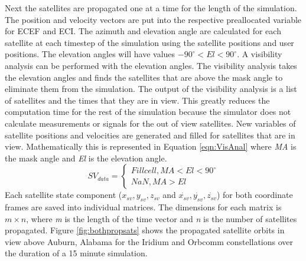 \documentclass[12pt]{report}
\begin{document}
Next the satellites are propagated one at a time for the length of the simulation. The position and velocity vectors are put into the respective preallocated variable for ECEF and ECI. The azimuth and elevation angle are calculated for each satellite at each timestep of the simulation using the satellite positions and user positions. The elevation angles will have values $-90^{\circ} < El < 90^{\circ}$. A visibility analysis can be performed with the elevation angles. The visibility analysis takes the elevation angles and finds the satellites that are above the mask angle to eliminate them from the simulation. The output of the visibility analysis is a list of satellites and the times that they are in view. This greatly reduces the computation time for the rest of the simulation because the simulator does not calculate measurements or signals for the out of view satellites. New variables of satellite positions and velocities are generated and filled for satellites that are in view. Mathematically this is represented in Equation \ref{eqn:VisAnal} where \textit{MA} is the mask angle and \textit{El} is the elevation angle.
\begin{equation}
    SV_{data} = 
    \left\{
        \begin{array}{lr}
            Fill cell, MA < El < 90^\circ \\
            NaN, MA > El
        \end{array}
    \right.
    \label{eqn:VisAnal}
\end{equation}
Each satellite state component ($x_{sv},y_{sv},z_{sv}$ and $\dot{x_{sv}},\dot{y_{sv}},\dot{z_{sv}}$) for both coordinate frames are saved into individual matrices. The dimensions for each matrix is $m \times n$, where \textit{m} is the length of the time vector and \textit{n} is the number of satellites propagated.
Figure \ref{fig:bothpropsats} shows the propagated satellite orbits in view above Auburn, Alabama for the Iridium and Orbcomm constellations over the duration of a 15 minute simulation. 
\end{document}
